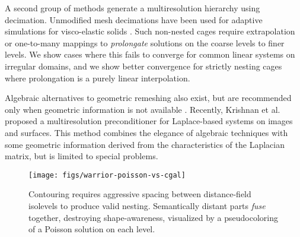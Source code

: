 A second group of methods generate a multiresolution hierarchy using decimation. Unmodified mesh decimations \cite{Garland:1997:SSU} have been used for adaptive
simulations for visco-elastic solids \cite{Debunne:2001:DRD}.
%
Such non-nested cages require extrapolation or one-to-many mappings to
\emph{prolongate} solutions on the coarse levels to finer levels.
%
We show cases where this fails to converge for common linear systems on
irregular domains, and we show better convergence for strictly nesting cages where
prolongation is a purely linear interpolation.

Algebraic alternatives to geometric remeshing also exist,
but are recommended only when geometric information is not available
\cite{falgout06}.
%
Recently, Krishnan et al.  proposed a
multiresolution preconditioner for Laplace-based systems on images and
surfaces.
%
This method combines the elegance of algebraic techniques with some geometric
information derived from the characteristics of the Laplacian matrix, but is
limited to special problems.

\begin{figure}
  \texttt{[image: figs/warrior-poisson-vs-cgal]}
  \caption{Contouring requires aggressive spacing between distance-field
  isolevels to produce valid nesting. Semantically distant parts \emph{fuse}
  together, destroying shape-awareness, visualized by a pseudocoloring of a
  Poisson solution on each level.} 
  \label{fig:warrior-poisson}
\end{figure}

